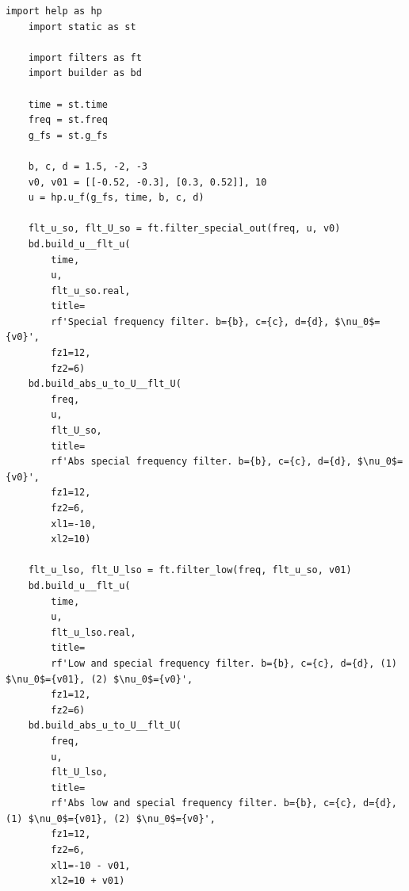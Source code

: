 \documentclass[a4paper, 12pt]{article}
\begin{document}
    \begin{lstlisting}[label=l7, caption={Файл nospec.py. Фильтрация специфических частот.}]
    import help as hp
    import static as st

    import filters as ft
    import builder as bd

    time = st.time
    freq = st.freq
    g_fs = st.g_fs

    b, c, d = 1.5, -2, -3
    v0, v01 = [[-0.52, -0.3], [0.3, 0.52]], 10
    u = hp.u_f(g_fs, time, b, c, d)

    flt_u_so, flt_U_so = ft.filter_special_out(freq, u, v0)
    bd.build_u__flt_u(
        time,
        u,
        flt_u_so.real,
        title=
        rf'Special frequency filter. b={b}, c={c}, d={d}, $\nu_0$={v0}',
        fz1=12,
        fz2=6)
    bd.build_abs_u_to_U__flt_U(
        freq,
        u,
        flt_U_so,
        title=
        rf'Abs special frequency filter. b={b}, c={c}, d={d}, $\nu_0$={v0}',
        fz1=12,
        fz2=6,
        xl1=-10,
        xl2=10)

    flt_u_lso, flt_U_lso = ft.filter_low(freq, flt_u_so, v01)
    bd.build_u__flt_u(
        time,
        u,
        flt_u_lso.real,
        title=
        rf'Low and special frequency filter. b={b}, c={c}, d={d}, (1) $\nu_0$={v01}, (2) $\nu_0$={v0}',
        fz1=12,
        fz2=6)
    bd.build_abs_u_to_U__flt_U(
        freq,
        u,
        flt_U_lso,
        title=
        rf'Abs low and special frequency filter. b={b}, c={c}, d={d}, (1) $\nu_0$={v01}, (2) $\nu_0$={v0}',
        fz1=12,
        fz2=6,
        xl1=-10 - v01,
        xl2=10 + v01)
    \end{lstlisting}
\end{document}
